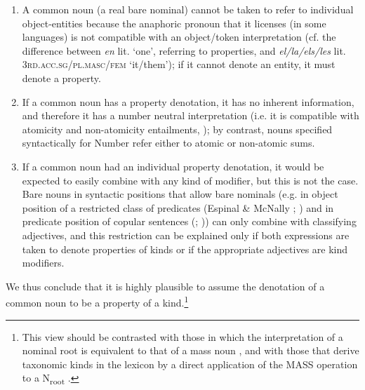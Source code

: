 \documentclass[output=paper
,modfonts
,nonflat]{langsci/langscibook}
\begin{document}
	\begin{enumerate}[label=(\roman*)]
	
	\item A common noun (a real bare nominal) cannot be taken to refer to individual object-entities because the anaphoric pronoun that it licenses (in some  languages) is not compatible with an object/token interpretation (cf. the difference between  \textit{en} lit. `one', referring to properties, and \textit{el/la/els/les} lit. 3\textsc{rd.acc.sg/pl.masc/fem} `it/them'); if it cannot denote an entity, it must denote a property. 
	
	\item If a common noun has a property denotation, it has no inherent  information, and therefore it has a number neutral interpretation (i.e. it is compatible with atomicity and non-atomicity entailments, \citealt{Farkas2003}); by contrast, nouns specified syntactically for Number refer either to atomic or non-atomic sums. 
	
	\item If a common noun had an individual property denotation, it would be expected to easily combine with any kind of modifier, but this is not the case. Bare nouns in syntactic positions that allow bare nominals (e.g. in object position of a restricted class of predicates (Espinal \& McNally \citeyear{Espinal2007a}; \citeyear{Espinal2011}) and in predicate position of copular sentences (\citealt{deSwart2007}; \citealt{Zamparelli2008})) can only combine with classifying adjectives, and this restriction can be explained only if both expressions are taken to denote properties of kinds or if the appropriate adjectives are kind modifiers.
	\end{enumerate}\largerpage[2] 
	
	We thus conclude that it is highly plausible to assume the denotation of a common noun to be a property of a kind.{\footnote{This view should be contrasted with those in which the interpretation of a nominal root is equivalent to that of a mass noun \citep{Borer2005,Rothstein2010}, and with those that derive taxonomic kinds in the lexicon by a direct application of the MASS operation to a N\textsubscript{root} \citep{PiresdeOliveira2011,Trugman2013}.}}
	
\end{document}
